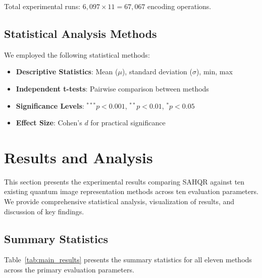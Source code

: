 \documentclass[pdflatex,sn-mathphys-num,Numbered]{sn-jnl}
\theoremstyle{thmstyleone}
\theoremstyle{thmstyletwo}
\theoremstyle{thmstylethree}
\begin{document}
Total experimental runs: $6,097 \times 11 = 67,067$ encoding operations.

\subsection{Statistical Analysis Methods}

We employed the following statistical methods:

\begin{itemize}
\item \textbf{Descriptive Statistics}: Mean ($\mu$), standard deviation ($\sigma$), min, max
\item \textbf{Independent t-tests}: Pairwise comparison between methods
\item \textbf{Significance Levels}: $^{***}p < 0.001$, $^{**}p < 0.01$, $^{*}p < 0.05$
\item \textbf{Effect Size}: Cohen's $d$ for practical significance
\end{itemize}


\section{Results and Analysis}\label{sec:results}

This section presents the experimental results comparing SAHQR against ten existing quantum image representation methods across ten evaluation parameters. We provide comprehensive statistical analysis, visualization of results, and discussion of key findings.

\subsection{Summary Statistics}

Table~\ref{tab:main_results} presents the summary statistics for all eleven methods across the primary evaluation parameters.
\end{document}
